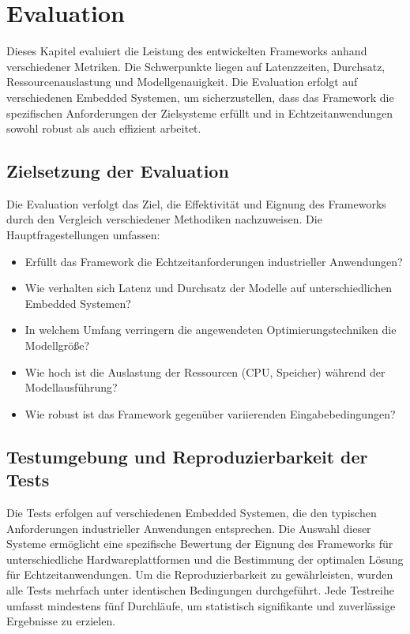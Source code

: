 \chapter{Evaluation}
\label{chap:evaluation}

Dieses Kapitel evaluiert die Leistung des entwickelten Frameworks anhand verschiedener Metriken. 
Die Schwerpunkte liegen auf Latenzzeiten, Durchsatz, Ressourcenauslastung und Modellgenauigkeit. 
Die Evaluation erfolgt auf verschiedenen Embedded Systemen, um sicherzustellen, dass das Framework 
die spezifischen Anforderungen der Zielsysteme erfüllt und in Echtzeitanwendungen sowohl robust als auch effizient arbeitet.

\section{Zielsetzung der Evaluation}

Die Evaluation verfolgt das Ziel, die Effektivität und Eignung des Frameworks durch den Vergleich verschiedener 
Methodiken nachzuweisen. Die Hauptfragestellungen umfassen:
\begin{itemize}
    \item Erfüllt das Framework die Echtzeitanforderungen industrieller Anwendungen?
    \item Wie verhalten sich Latenz und Durchsatz der Modelle auf unterschiedlichen Embedded Systemen?
    \item In welchem Umfang verringern die angewendeten Optimierungstechniken die Modellgröße?
    \item Wie hoch ist die Auslastung der Ressourcen (CPU, Speicher) während der Modellausführung?
    \item Wie robust ist das Framework gegenüber variierenden Eingabebedingungen?
\end{itemize}

\section{Testumgebung und Reproduzierbarkeit der Tests}

Die Tests erfolgen auf verschiedenen Embedded Systemen, die den typischen Anforderungen industrieller Anwendungen entsprechen. 
Die Auswahl dieser Systeme ermöglicht eine spezifische Bewertung der Eignung des Frameworks für unterschiedliche Hardwareplattformen 
und die Bestimmung der optimalen Lösung für Echtzeitanwendungen. Um die Reproduzierbarkeit zu gewährleisten, wurden alle Tests 
mehrfach unter identischen Bedingungen durchgeführt. Jede Testreihe umfasst mindestens fünf Durchläufe, um statistisch signifikante 
und zuverlässige Ergebnisse zu erzielen.

